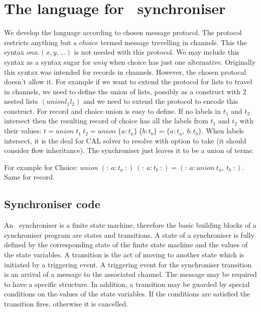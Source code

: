 \section{The language for \ak\ synchroniser}
We develop the language according to chosen message protocol. The protocol restricts anything but a $choice$ termed message trevelling in channels. This the syntax $on a.(x,y, ...)$ is not needed with this protocol. We may include this syntax as a syntax sugar for $uniq$ when choice has just one alternative. Originally this syntax was intended for records in channels. However, the chosen protocal doesn't allow it. For example if we want to extend the protocol for lists to travel in channels, we need to define the union of lists, possibly as a construct with 2 nested lists $(union l_1 l_2)$ and we need to extend the protocol to encode this construct. For record and choice union is easy to define. If no labels in $t_1$ and $t_2$ intersect then the resulting record of choice has all the labels from $t_1$ and $t_2$ with their values: $t = union \; t_1 \: t_2 = union \; \{a:t_a\} \: \{b:t_b\} = \{a:t_a, \: b:t_b\}$. When labels intersect, it is the deal for CAL solver to resolve with option to take (it should consider flow inheritance). The synchroniser just leaves it to be a union of terms:

For example for Choice: $union \; (: \: a:t_a \: :) \: (: \: a:t_b \: :) = (: \: a:union \: t_a, \: t_b \: :)$.
Same for record.


\subsection{Synchroniser code}
An \ak\ synchroniser is a finite state machine, therefore the basic building blocks of a synchroniser program are states and transitions. A state of a synchroniser is fully defined by the corresponding state of the finite state machine and the values of the state variables. A transition is the act of moving to another state which is initiated by a triggering event. A triggering event for the synchroniser transition is an arrival of a message to the associated channel. The message may be required to have a specific structure. In addition, a transition may be guarded by special conditions on the values of the state variables. If the conditions are satisfied the transition fires, otherwise it is cancelled.

